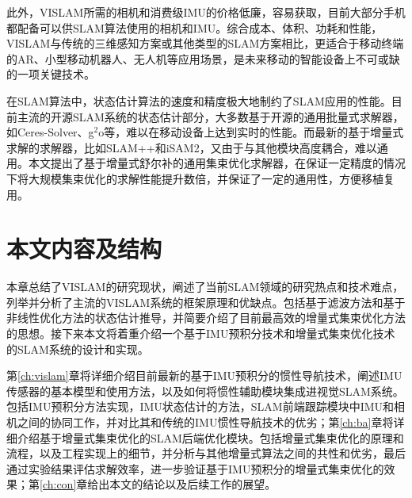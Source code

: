 此外，VISLAM所需的相机和消费级IMU的价格低廉，容易获取，目前大部分手机都配备可以供SLAM算法使用的相机和IMU。综合成本、体积、功耗和性能，VISLAM与传统的三维感知方案或其他类型的SLAM方案相比，更适合于移动终端的AR、小型移动机器人、无人机等应用场景，是未来移动的智能设备上不可或缺的一项关键技术。

在SLAM算法中，状态估计算法的速度和精度极大地制约了SLAM应用的性能。目前主流的开源SLAM系统的状态估计部分，大多数基于开源的通用批量式求解器，如Ceres-Solver\citep{ceres-solver}、g$^2$o\citep{kummerle2011g}等，难以在移动设备上达到实时的性能。而最新的基于增量式求解的求解器，比如SLAM++\citep{ila2017fast}和iSAM2\citep{kaess2012isam2}，又由于与其他模块高度耦合，难以通用。本文提出了基于增量式舒尔补的通用集束优化求解器，在保证一定精度的情况下将大规模集束优化的求解性能提升数倍，并保证了一定的通用性，方便移植复用。




\section{本文内容及结构}

本章总结了VISLAM的研究现状，阐述了当前SLAM领域的研究热点和技术难点，列举并分析了主流的VISLAM系统的框架原理和优缺点。包括基于滤波方法和基于非线性优化方法的状态估计推导，并简要介绍了目前最高效的增量式集束优化方法的思想。接下来本文将着重介绍一个基于IMU预积分技术和增量式集束优化技术的SLAM系统的设计和实现。

第\ref{ch:vislam}章将详细介绍目前最新的基于IMU预积分的惯性导航技术，阐述IMU传感器的基本模型和使用方法，以及如何将惯性辅助模块集成进视觉SLAM系统。包括IMU预积分方法实现，IMU状态估计的方法，SLAM前端跟踪模块中IMU和相机之间的协同工作，并对比其和传统的IMU惯性导航技术的优劣；第\ref{ch:ba}章将详细介绍基于增量式集束优化的SLAM后端优化模块。包括增量式集束优化的原理和流程，以及工程实现上的细节，并分析与其他增量式算法之间的共性和优劣，最后通过实验结果评估求解效率，进一步验证基于IMU预积分的增量式集束优化的效果；第\ref{ch:con}章给出本文的结论以及后续工作的展望。
